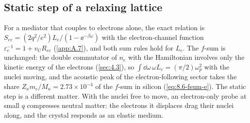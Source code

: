 \subsection{Static step of a relaxing lattice}\label{sec:10.2-lattice}

For a mediator that couples to electrons alone, the exact relation is $S_{ee} = (2q^2/e^2)L_e/(1 - \ee^{-\beta\omega})$ with the electron-channel function $\varepsilon_e^{-1} = 1 + v_{\mathrm{C}}R_{ee}$ (\cref{app:A.7}), and both sum rules hold for $L_e$. The $f$-sum is unchanged: the double commutator of $n_e$ with the Hamiltonian involves only the kinetic energy of the electrons (\cref{sec:4.3}), so $\int\dd\omega\,\omega L_e = (\pi/2)\omega_p^2$ with the nuclei moving, and the acoustic peak of the electron-following sector takes the share $Z_\kappa m_e/M_\kappa = 2.73\times10^{-4}$ of the $f$-sum in silicon (\cref{eq:8.6-fsum-e}). The static step is a different matter. With the nuclei free to move, an electron-only probe at small $q$ compresses neutral matter: the electrons it displaces drag their nuclei along, and the crystal responds as an elastic medium.

